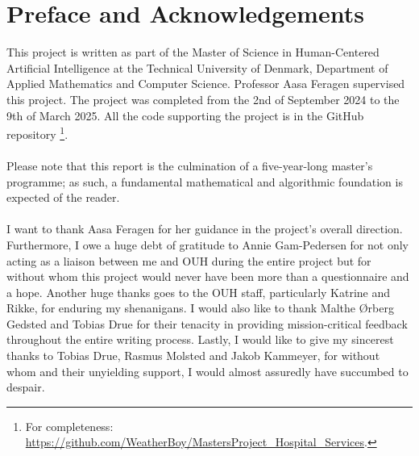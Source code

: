 \section*{Preface and Acknowledgements}
This project is written as part of the Master of Science in Human-Centered Artificial Intelligence at the Technical University of Denmark, Department of Applied Mathematics and Computer Science. Professor Aasa Feragen supervised this project. The project was completed from the 2nd of September 2024 to the 9th of March 2025. All the code supporting the project is in the GitHub repository \footnote{For completeness: \href{https://github.com/WeatherBoy/MastersProject_Hospital_Services}{https://github.com/WeatherBoy/MastersProject\_Hospital\_Services}.}.
\\
\\
Please note that this report is the culmination of a five-year-long master's programme; as such, a fundamental mathematical and algorithmic foundation is expected of the reader.
\\
\\
I want to thank Aasa Feragen for her guidance in the project's overall direction. Furthermore, I owe a huge debt of gratitude to Annie Gam-Pedersen for not only acting as a liaison between me and OUH during the entire project but for without whom this project would never have been more than a questionnaire and a hope. Another huge thanks goes to the OUH staff, particularly Katrine and Rikke, for enduring my shenanigans.
I would also like to thank Malthe \O rberg Gedsted and Tobias Drue for their tenacity in providing mission-critical feedback throughout the entire writing process.
Lastly, I would like to give my sincerest thanks to Tobias Drue, Rasmus Molsted and Jakob Kammeyer, for without whom and their unyielding support, I would almost assuredly have succumbed to despair.